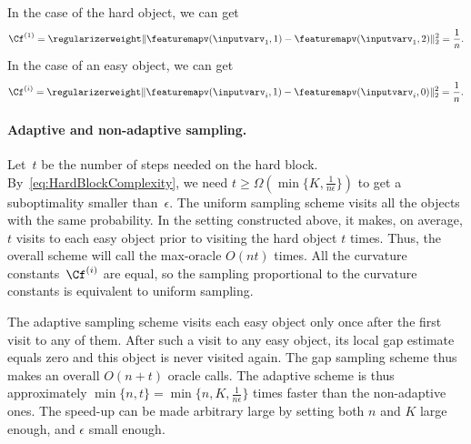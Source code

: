 \documentclass{article}
\begin{document}
In the case of the hard object, we can get
\begin{equation} \label{eq:Cf1HardBlock}
\Cf^{(1)} = \regularizerweight  \Vert \featuremapv(\inputvarv_1,1)-\featuremapv(\inputvarv_1,2)\Vert_2^2 = \frac{1}{n}.
\end{equation}
In the case of an easy object, we can get 
\begin{equation}  \label{eq:CfiEasyBlock}
\Cf^{(i)} = \regularizerweight  \Vert \featuremapv(\inputvarv_i,1)-\featuremapv(\inputvarv_i,0)\Vert_2^2 = \frac{1}{n}.
\end{equation}

%
%
%
%
%
%
%
%
%
%
%



%
%
%
%
%
%
%
%
%
%
%
%
%
%
%
%
%
%
%
%
%
%
%
%
%
%
%
%

%




\paragraph{Adaptive and non-adaptive sampling.}
Let~$t$ be the number of steps needed on the hard block. By~\eqref{eq:HardBlockComplexity}, we need $t \geq \Omega(\min\{K, \frac{1}{n\epsilon}\} )$ to get a suboptimality smaller than~$\epsilon$. 
The uniform sampling scheme visits all the objects with the same probability.
In the setting constructed above, it makes, on average, $t$ visits to each easy object prior to visiting the hard object $t$ times.
Thus, the overall scheme will call the max-oracle $O(nt)$ times.
All the curvature constants~$\Cf^{(i)}$ are equal, so the sampling proportional to the curvature constants is equivalent to uniform sampling.

The adaptive sampling scheme visits each easy object only once after the first visit to any of them.
After such a visit to any easy object, its local gap estimate equals zero and this object is never visited again.
The gap sampling scheme thus makes an overall $O(n + t)$ oracle calls.
The adaptive scheme is thus approximately $\min\{n,t\} = \min\{n, K, \frac{1}{n \epsilon} \}$ times faster than the non-adaptive ones.
The speed-up can be made arbitrary large by setting both $n$ and $K$ large enough, and $\epsilon$ small enough.
\end{document}

